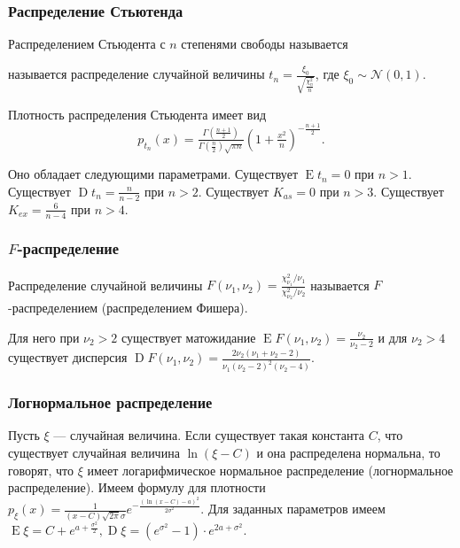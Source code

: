 \documentclass[12pt]{article}
\numberwithin{theorem}{section}
\theoremstyle{definition}
\newcommand{\defin}[2]{\hypertarget{#2}{{\color{red} #1}}}
\newcommand{\expect}{\operatorname{E}}
\newcommand{\disp}{\operatorname{D}}
\begin{document}
	\subsubsection{Распределение Стьютенда}
	
	\defin{Распределением Стьюдента с $ n $ степенями свободы называется}{Student-distribution}
	называется распределение случайной величины $ t_n = \tfrac{\xi_0}{\sqrt{\tfrac{\chi_n^2}{n}}} $,
	где $ \xi_0 \sim \mathcal{N}(0, 1) $.
	
	Плотность распределения Стьюдента имеет вид
	$$ p_{t_n}(x) = \tfrac{\Gamma(\tfrac{n + 1}{2})}{\Gamma(\tfrac{n}{2})\sqrt{\pi n}}(1 + \tfrac{x^2}{n})^{-\tfrac{n + 1}{2}}. $$
	
	Оно обладает следующими параметрами.
	Существует $ \expect t_n = 0 $ при $ n > 1 $.
	Существует $ \disp t_n = \tfrac{n}{n - 2} $ при $ n > 2 $.
	Существует $ K_{as} = 0 $ при $ n > 3 $.
	Существует $ K_{ex} = \tfrac{6}{n - 4} $ при $ n > 4 $.
	
	\subsubsection{$ F $-распределение}
	
	Распределение случайной величины $ F(\nu_1, \nu_2) = \tfrac{\chi_{\nu_1}^2 / \nu_1}{\chi_{\nu_2}^2 / \nu_2} $
	называется \defin{$ F $-распределением (распределением Фишера)}{F-distribtuion}.
	
	Для него при $ \nu_2 > 2 $ существует матожидание $ \expect F(\nu_1, \nu_2)
	= \tfrac{\nu_2}{\nu_2 - 2} $
	и для $ \nu_2 > 4 $ существует дисперсия 
	$ \disp F(\nu_1, \nu_2) = \tfrac{2\nu_2(\nu_1 + \nu_2 - 2)}{\nu_1(\nu_2 - 2)^2(\nu_2 - 4)} $.
	
	\subsubsection{Логнормальное распределение}
	
	Пусть $ \xi $ --- случайная величина. Если существует такая константа $ C $,
	что существует случайная величина $ \ln(\xi - C) $ и она распределена нормальна,
	то говорят, что $ \xi $ имеет 
	\defin{логарифмическое нормальное распределение (логнормальное распределение)}{lognormal-distribution}.
	Имеем формулу для плотности
	$ p_\xi(x) = \tfrac{1}{(x - C)\sqrt{2\pi}\sigma}e^{-\tfrac{(\ln(x - C) - a)^2}{2\sigma^2}} $.
	Для заданных параметров имеем
	$ \expect\xi = C + e^{a + \tfrac{\sigma^2}{2}}, 
	\disp\xi = (e^{\sigma^2} - 1) \cdot e^{2a + \sigma^2} $.
	
\end{document}
